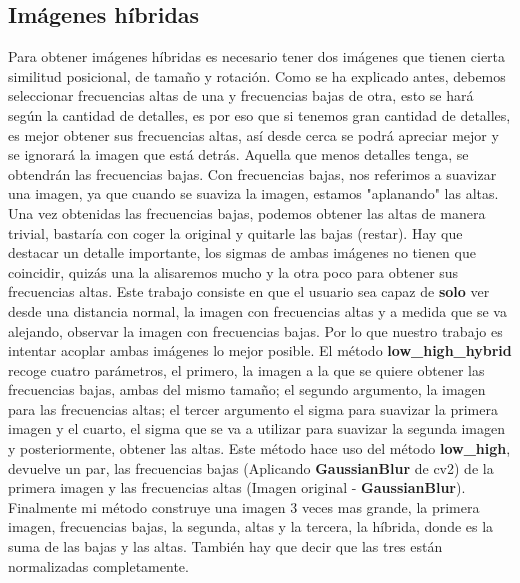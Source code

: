\documentclass{article}
\begin{document}
\subsection{Imágenes híbridas}
Para obtener imágenes híbridas es necesario tener dos imágenes que tienen cierta similitud posicional, de tamaño y rotación. \newline
Como se ha explicado antes, debemos seleccionar frecuencias altas de una y frecuencias bajas de otra, esto se hará según la cantidad de detalles, es por eso que si tenemos gran cantidad de detalles, es mejor obtener sus frecuencias altas, así desde cerca se podrá apreciar mejor y se ignorará la imagen que está detrás. Aquella que menos detalles tenga, se obtendrán las frecuencias bajas. 
\newline
\newline
Con frecuencias bajas, nos referimos a suavizar una imagen, ya que cuando se suaviza la imagen, estamos "aplanando" las altas. Una vez obtenidas las frecuencias bajas, podemos obtener las altas de manera trivial, bastaría con coger la original y quitarle las bajas (restar).
\newline
Hay que destacar un detalle importante, los sigmas de ambas imágenes no tienen que coincidir, quizás una la alisaremos mucho y la otra poco para obtener sus frecuencias altas.
\newline
\newline
Este trabajo consiste en que el usuario sea capaz de \textbf{solo} ver desde una distancia normal, la imagen con frecuencias altas y a medida que se va alejando, observar la imagen con frecuencias bajas. Por lo que nuestro trabajo es intentar acoplar ambas imágenes lo mejor posible.
\newline
\newline
El método \textbf{low\_high\_hybrid} recoge cuatro parámetros, el primero, la imagen a la que se quiere obtener las frecuencias bajas, ambas del mismo tamaño; el segundo argumento, la imagen para las frecuencias altas; el tercer argumento el sigma para suavizar la primera imagen y el cuarto, el sigma que se va a utilizar para suavizar la segunda imagen y posteriormente, obtener las altas.\newline
Este método hace uso del método \textbf{low\_high}, devuelve un par, las frecuencias bajas (Aplicando \textbf{GaussianBlur} de cv2) de la primera imagen y las frecuencias altas (Imagen original - \textbf{GaussianBlur}).
\newline
\newline
Finalmente mi método construye una imagen 3 veces mas grande, la primera imagen, frecuencias bajas, la segunda, altas y la tercera, la híbrida, donde es la suma de las bajas y las altas. También hay que decir que las tres están normalizadas completamente.
\end{document}
